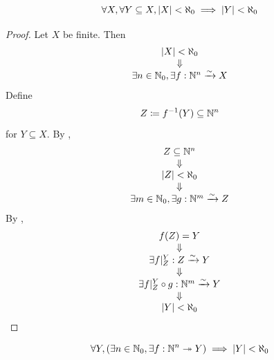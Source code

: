 \bigskip

\begin{theorem} \label{an:thm:subset-of-finite-set-is-finite}
    \[
    \forall X, \forall Y \subseteq X, \abs*{X} < \aleph_{0} \implies \abs*{Y} < \aleph_{0}
    \]
\end{theorem}

\begin{proof}
    Let $X$ be finite. Then
    \[
    \begin{array}{c}
        \abs*{X} < \aleph_{0} \\
        \Downarrow \\
        \exists n \in \N_{0}, \exists f: \N^{n} \xrightarrow{\sim} X
    \end{array}
    \]
    Define
    \[
    Z \coloneqq f^{-1}(Y) \subseteq \N^{n}
    \]
    for $Y \subseteq X$. By ,
    \[
    \begin{array}{c}
        Z \subseteq \N^{n} \\
        \Downarrow \\
        \abs*{Z} < \aleph_{0} \\
        \Downarrow \\
        \exists m \in \N_{0}, \exists g: \N^{m} \xrightarrow{\sim} Z
    \end{array}
    \]
    By ,
    \[
    \begin{array}{c}
        f(Z) = Y \\
        \Downarrow \\
        \exists f|_{Z}^{Y}: Z \xrightarrow{\sim} Y \\
        \Downarrow \\
        \exists f|_{Z}^{Y} \circ g: \N^{m} \xrightarrow{\sim} Y \\
        \Downarrow \\
        \abs*{Y} < \aleph_{0}
    \end{array}
    \]
\end{proof}

\bigskip

\begin{lemma} \label{an:lem:surjection-from-Nn-implies-finite}
    \[
    \forall Y, \paren*{\exists n \in \N_{0}, \exists f: \N^{n} \twoheadrightarrow Y} \implies \abs*{Y} < \aleph_{0}
    \]
\end{lemma}

